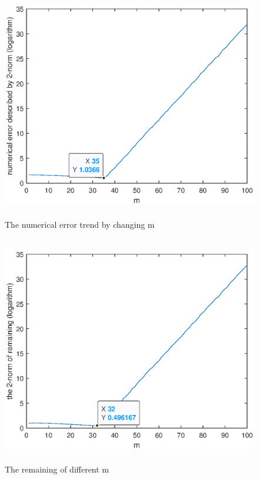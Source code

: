 \documentclass[UTF8,a4paper,10pt]{ctexart}
\begin{document}
\begin{figure}[ht]
    \centering
    \includegraphics[width=14cm,height=10cm]{2.4_error.eps}
    \caption{The numerical error trend by changing m}
\end{figure}
\begin{figure}[ht]
    \centering
    \includegraphics[width=14cm,height=10cm]{2.4_remaining.eps}
    \caption{The remaining of different m}
\end{figure}
\end{document}
